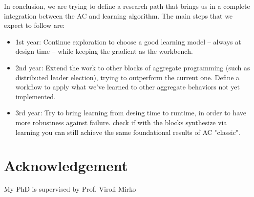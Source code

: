 \documentclass[conference]{IEEEtran}
\begin{document}
In conclusion, we are trying to define a research path that brings us in a complete integration between the AC and learning algorithm.
The main steps that we expect to follow are:
\begin{itemize}
    \item 1st year: Continue exploration to choose a good learning model -- always at design time -- while keeping the gradient as the workbench. 
    \item 2nd year: Extend the work to other blocks of aggregate programming (such as distributed leader election), trying to outperform the current one. Define a workflow to apply what we've learned to other aggregate behaviors not yet implemented.
    \item 3rd year: Try to bring learning from desing time to runtime, in order to have more robustness against failure. check if with the blocks synthesize via learning you can still achieve the same foundational results of AC "classic".

\end{itemize}
\section*{Acknowledgement}
My PhD is supervised by Prof. Viroli Mirko


\end{document}
